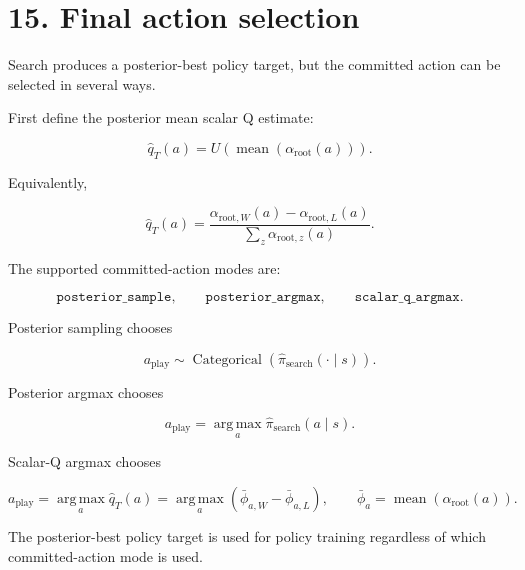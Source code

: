 \documentclass[11pt]{article}
\newcommand{\Cat}{\operatorname{Categorical}}
\newcommand{\argmax}{\operatorname*{arg\,max}}
\newcommand{\mean}{\operatorname{mean}}
\newcommand{\Utility}{U}
\begin{document}
\section*{15. Final action selection}

Search produces a posterior-best policy target, but the committed action can be
selected in several ways.

First define the posterior mean scalar Q estimate:

\[
\hat{q}_T(a)
=
\Utility
\left(
\mean
\left(
\alpha_{\mathrm{root}}(a)
\right)
\right).
\]

Equivalently,

\[
\hat{q}_T(a)
=
\frac{
\alpha_{\mathrm{root},W}(a)
-
\alpha_{\mathrm{root},L}(a)
}{
\sum_z \alpha_{\mathrm{root},z}(a)
}.
\]

The supported committed-action modes are:

\[
\texttt{posterior\_sample},
\qquad
\texttt{posterior\_argmax},
\qquad
\texttt{scalar\_q\_argmax}.
\]

Posterior sampling chooses

\[
a_{\mathrm{play}}
\sim
\Cat
\left(
\hat{\pi}_{\mathrm{search}}(\cdot\mid s)
\right).
\]

Posterior argmax chooses

\[
a_{\mathrm{play}}
=
\argmax_a
\hat{\pi}_{\mathrm{search}}(a\mid s).
\]

Scalar-Q argmax chooses

\[
a_{\mathrm{play}}
=
\argmax_a
\hat{q}_T(a)
=
\argmax_a
\left(
\bar\phi_{a,W}-\bar\phi_{a,L}
\right),
\qquad
\bar\phi_a=\mean(\alpha_{\mathrm{root}}(a)).
\]

The posterior-best policy target is used for policy training regardless of which
committed-action mode is used.
\end{document}
